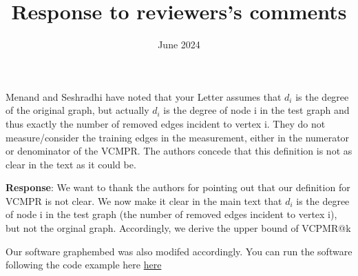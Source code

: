 \documentclass{article}
\title{Response to reviewers's comments}
\date{June 2024}
\begin{document}
\maketitle

Menand and Seshradhi have noted that your Letter assumes that $d_i$ 
is the degree of the original graph, but actually $d_i$ is the degree 
of node i in the test graph and thus exactly the number of removed 
edges incident to vertex i. They do not measure/consider the training 
edges in the measurement, either in the numerator or denominator of the VCMPR. 
The authors concede that this definition is not as clear in the text as it could be.

\textbf{Response}: We want to thank the authors for pointing out that our definition for VCMPR is not clear.
We now make it clear in the main text that $d_i$ is the degree 
of node i in the test graph (the number of removed 
edges incident to vertex i), but not the orginal graph. Accordingly, we derive the upper bound of VCPMR@k

Our software graphembed was also modifed accordingly. You can run the software following the code example here \href{https://github.com/jean-pierreBoth/linkauc/blob/master/running_graphembed.md}{\color{blue}here}



\end{document}
